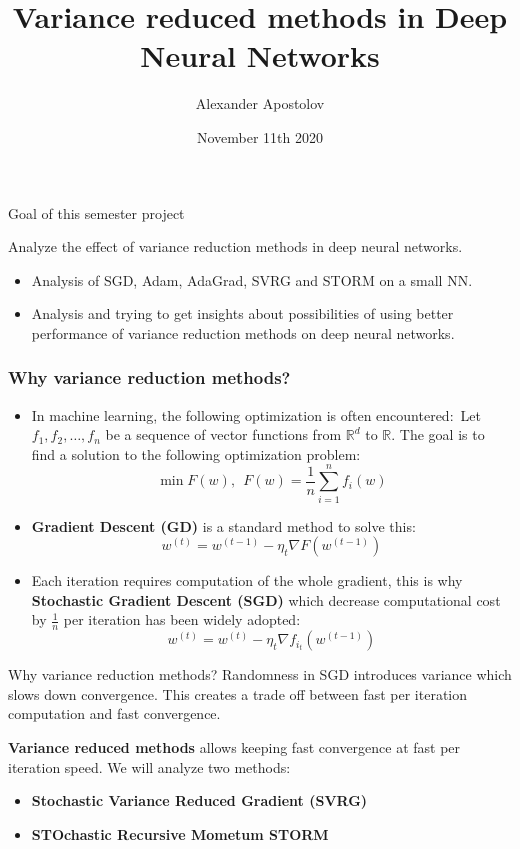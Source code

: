 \documentclass[10pt]{beamer}
\title{Variance reduced methods in Deep Neural Networks}
\author{Alexander Apostolov}
\institute {Ecole Polytechnique Fédérale de Lausanne}
\date{November 11th 2020}
\begin{document}
\frame{\titlepage}


\begin{frame}{Goal of this semester project}

Analyze the effect of \alert{variance reduction methods} in \alert{deep neural networks}.
\newline
\begin{itemize}
    \item Analysis of SGD, Adam, AdaGrad, SVRG and STORM on a small NN.
    \item Analysis and trying to get insights about possibilities of using better performance of variance reduction methods on deep neural networks. 
\end{itemize}
    
\end{frame}

\begin{frame}
\frametitle{Why variance reduction methods?}
\begin{itemize}
    \item In machine learning, the following optimization is often encountered:\
    Let $f_1, f_2, \dots, f_n$ be a sequence of vector functions from $\mathbb{R}^d$ to $\mathbb{R}$.
    The goal is to find a solution to the following optimization problem:
    $$\min F(w),~~F(w)=\frac{1}{n}\sum_{i=1}^n f_i(w)$$
    \item \textbf{Gradient Descent (GD)} is a standard method to solve this:
    $$w^{(t)} = w^{(t-1)} - \eta_t \nabla F(w^{(t-1)})$$
    \item Each iteration requires computation of the whole gradient, this is why \textbf{Stochastic Gradient Descent (SGD)} which decrease computational cost by $\frac{1}{n}$ per iteration has been widely adopted:
    $$w^{(t)} = w^{(t)} -\eta_t \nabla f_{i_t}(w^{(t-1)})$$
\end{itemize}
\end{frame}

\begin{frame}{Why variance reduction methods?}
    Randomness in SGD introduces variance which slows down convergence. This creates a trade off between fast per iteration computation and fast convergence.
    
    \vspace{5mm}
    \textbf{Variance reduced methods} allows keeping fast convergence at fast per iteration speed. We will analyze two methods:
    \begin{itemize}
        \item \textbf{Stochastic Variance Reduced Gradient (SVRG)}
        \item \textbf{STOchastic Recursive Mometum STORM}
    \end{itemize}
    
\end{frame}
\end{document}
